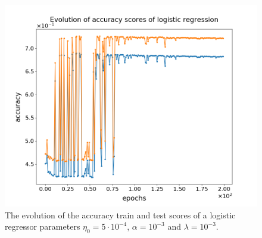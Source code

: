 \documentclass[nofootinbib,reprint,english]{revtex4-1}
\begin{document}
\newpage

\begin{figure}[ht]
\centering
\includegraphics[scale=0.3]{../output/LogReg/AccuracyEvolution_the_long_run.png}
\caption{The evolution of the accuracy train and test scores of a logistic regressor parameters \(\eta_0=5\cdot10^{-4}\), \(\alpha=10^{-3}\) and \(\lambda=10^{-3}\).}\label{fig:LogReg_AccuracyEvolution_long}
\end{figure}
\end{document}
